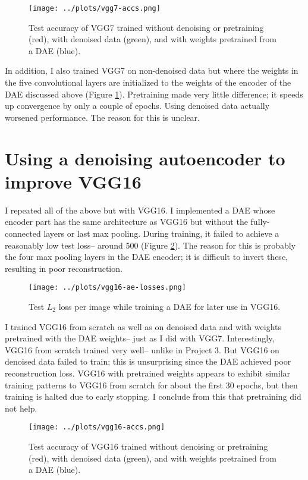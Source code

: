 \documentclass[11pt]{article}
\begin{document}
\begin{figure}
\centering
\texttt{[image: ../plots/vgg7-accs.png]}
\caption{\label{fig-vgg7-accs} Test accuracy of VGG7 trained without denoising or pretraining (red), with denoised data (green), and with weights pretrained from a DAE (blue).}
\end{figure}

In addition, I also trained VGG7 on non-denoised data but where the weights in the five convolutional layers are initialized to the weights of the encoder of the DAE discussed above (Figure \ref{fig-vgg7-accs}). Pretraining made very little difference; it speeds up convergence by only a couple of epochs. Using denoised data actually worsened performance. The reason for this is unclear.


\section{Using a denoising autoencoder to improve VGG16}

I repeated all of the above but with VGG16. I implemented a DAE whose encoder part has the same architecture as VGG16 but without the fully-connected layers or last max pooling. During training, it failed to achieve a reasonably low test loss-- around 500 (Figure \ref{fig-vgg16-ae}). The reason for this is probably the four max pooling layers in the DAE encoder; it is difficult to invert these, resulting in poor reconstruction.

\begin{figure}
\centering
\texttt{[image: ../plots/vgg16-ae-losses.png]}
\caption{\label{fig-vgg16-ae} Test $L_2$ loss per image while training a DAE for later use in VGG16.}
\end{figure}

I trained VGG16 from scratch as well as on denoised data and with weights pretrained with the DAE weights-- just as I did with VGG7. Interestingly, VGG16 from scratch trained very well-- unlike in Project 3. But VGG16 on denoised data failed to train; this is unsurprising since the DAE achieved poor reconstruction loss. VGG16 with pretrained weights appears to exhibit similar training patterns to VGG16 from scratch for about the first 30 epochs, but then training is halted due to early stopping. I conclude from this that pretraining did not help.

\begin{figure}
\centering
\texttt{[image: ../plots/vgg16-accs.png]}
\caption{\label{fig-vgg16-accs} Test accuracy of VGG16 trained without denoising or pretraining (red), with denoised data (green), and with weights pretrained from a DAE (blue).}
\end{figure}
\end{document}
